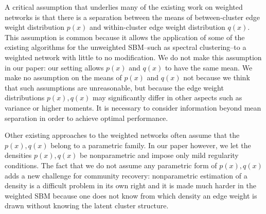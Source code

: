 \documentclass{article}
\begin{document}
A critical assumption that underlies many of the existing work on weighted networks is that there is a separation between the means of between-cluster edge weight distribution $p(x)$ and within-cluster edge weight distribution $q(x)$. This assumption is common because it allows the application of some of the existing algorithms for the unweighted SBM--such as spectral clustering--to a weighted network with little to no modification. We do not make this assumption in our paper: our setting allows $p(x)$ and $q(x)$ to have the same mean. We make no assumption on the means of $p(x)$ and $q(x)$ not because we think that such assumptions are unreasonable, but because the edge weight distributions $p(x), q(x)$ may significantly differ in other aspects such as variance or higher moments. It is necessary to consider information beyond mean separation in order to achieve optimal performance.


Other existing approaches to the weighted networks often assume that the $p(x), q(x)$ belong to a parametric family. In our paper however, we let the densities $p(x), q(x)$ be nonparametric and impose only mild regularity conditions. The fact that we do not assume any parametric form of $p(x), q(x)$ adds a new challenge for community recovery: nonparametric estimation of a density is a difficult problem in its own right and it is made much harder in the weighted SBM because one does not know from which density an edge weight is drawn without knowing the latent cluster structure. 
\end{document}
